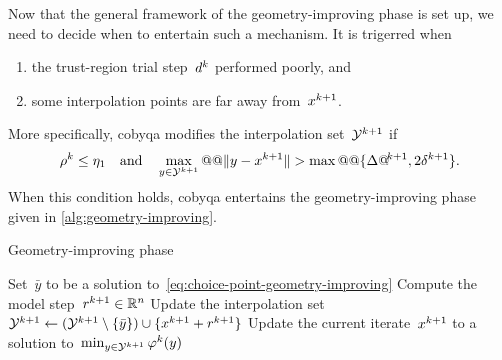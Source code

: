 Now that the general framework of the geometry-improving phase is set up, we need to decide when to entertain such a mechanism.
It is trigerred when
\begin{enumerate}
    \item the trust-region trial step~$\step[k]$ performed poorly, and
    \item some interpolation points are far away from~$\iter[k + 1]$.
\end{enumerate}
More specifically, \gls{cobyqa} modifies the interpolation set~$\xpt[k + 1]$ if
\begin{equation*}
    \ratio[k] \le \eta_1 \quad \text{and} \quad \max_{y \in \xpt[k + 1]} @@ \norm{y - \iter[k + 1]} > \max @@ \set{\rad[k + 1], 2 \radlb[k + 1]}.
\end{equation*}
When this condition holds, \gls{cobyqa} entertains the geometry-improving phase given in \cref{alg:geometry-improving}.

\begin{algorithm}
    \caption{Geometry-improving phase}
    \label{alg:geometry-improving}
    \DontPrintSemicolon
    \onehalfspacing
    Set~$\bar{y}$ to be a solution to~\cref{eq:choice-point-geometry-improving}\;
    Compute the model step~$\rstep[k + 1] \in \R^n$\;
    Update the interpolation set~$\xpt[k + 1] \gets (\xpt[k + 1] \setminus \set{\bar{y}}) \cup \set{\iter[k + 1] + \rstep[k + 1]}$\;
    Update the current iterate~$\iter[k + 1]$ to a solution to~$\min_{y \in \xpt[k + 1]} \merit[k](y)$ \label{alg:geometry-improving-iterate}\;
\end{algorithm}

